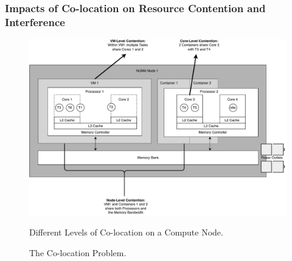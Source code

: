 \subsubsection{Impacts of Co-location on Resource Contention and Interference}
\label{sec:background_colocation_interference}

\begin{figure}[H]
    \centering
    \includegraphics[scale=0.5]{fig/02/02-coloc-overview.pdf}
    \caption{The Co-location Problem.}
    \label{fig:02-coloc-overview}
    \tiny
    Different Levels of Co-location on a Compute Node.
\end{figure}

